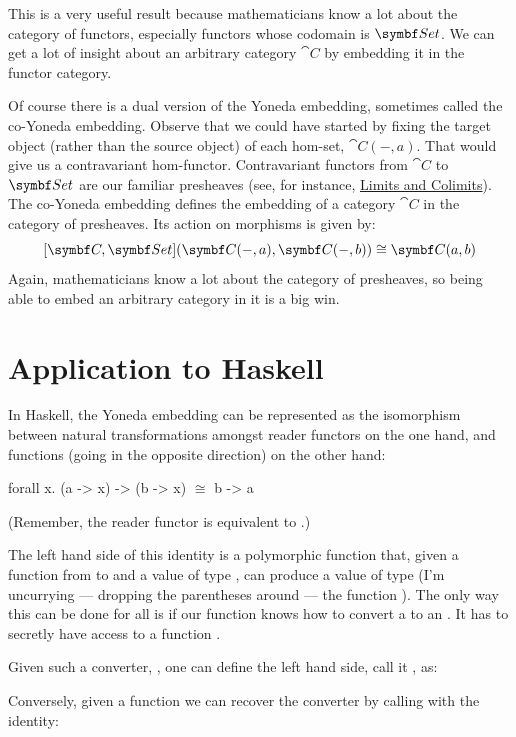 This is a very useful result because mathematicians know a lot about the
category of functors, especially functors whose codomain is
$\Set$. We can get a lot of insight about an arbitrary category
$\cat{C}$ by embedding it in the functor category.

Of course there is a dual version of the Yoneda embedding, sometimes
called the co-Yoneda embedding. Observe that we could have started by
fixing the target object (rather than the source object) of each
hom-set, $\cat{C}(-, a)$. That would give us a contravariant
hom-functor. Contravariant functors from $\cat{C}$ to $\Set$ are
our familiar presheaves (see, for instance,
\hyperref[limits-and-colimits]{Limits
  and Colimits}). The co-Yoneda embedding defines the embedding of a
category $\cat{C}$ in the category of presheaves. Its action on morphisms
is given by:
\[[\cat{C}, \Set](\cat{C}(-, a), \cat{C}(-, b)) \cong \cat{C}(a, b)\]
Again, mathematicians know a lot about the category of presheaves, so
being able to embed an arbitrary category in it is a big win.

\section{Application to Haskell}

In Haskell, the Yoneda embedding can be represented as the isomorphism
between natural transformations amongst reader functors on the one hand,
and functions (going in the opposite direction) on the other hand:

\begin{snipv}
forall x. (a -> x) -> (b -> x) \ensuremath{\cong} b -> a
\end{snipv}
(Remember, the reader functor is equivalent to
.)

The left hand side of this identity is a polymorphic function that,
given a function from  to  and a value of type
, can produce a value of type  (I'm uncurrying ---
dropping the parentheses around --- the function
). The only way this can be done for all
 is if our function knows how to convert a  to an
. It has to secretly have access to a function
.

Given such a converter, , one can define the left hand
side, call it , as:

Conversely, given a function  we can recover the converter
by calling  with the identity:

